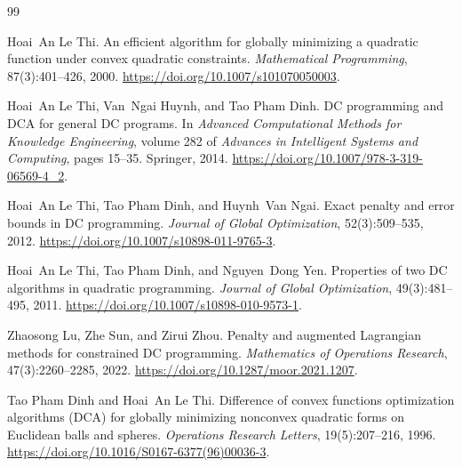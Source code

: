 \documentclass[pdflatex,sn-mathphys-num]{sn-jnl}
\theoremstyle{thmstyleone}
\theoremstyle{thmstylethree}
\newcounter{algorithm}
\begin{document}
\begin{thebibliography}{99}

Hoai~An {Le Thi}.
\newblock An efficient algorithm for globally minimizing a quadratic function
  under convex quadratic constraints.
\newblock \emph{Mathematical Programming}, 87(3):401--426, 2000.
\newblock \url{https://doi.org/10.1007/s101070050003}.

Hoai~An {Le Thi}, Van~Ngai Huynh, and Tao {Pham Dinh}.
\newblock DC programming and DCA for general DC programs.
\newblock In \emph{Advanced Computational Methods for Knowledge Engineering},
  volume 282 of \emph{Advances in Intelligent Systems and Computing},
  pages 15--35. Springer, 2014.
\newblock \url{https://doi.org/10.1007/978-3-319-06569-4_2}.

Hoai~An {Le Thi}, Tao {Pham Dinh}, and Huynh~Van Ngai.
\newblock Exact penalty and error bounds in DC programming.
\newblock \emph{Journal of Global Optimization}, 52(3):509--535, 2012.
\newblock \url{https://doi.org/10.1007/s10898-011-9765-3}.

Hoai~An {Le Thi}, Tao {Pham Dinh}, and Nguyen~Dong Yen.
\newblock Properties of two DC algorithms in quadratic programming.
\newblock \emph{Journal of Global Optimization}, 49(3):481--495, 2011.
\newblock \url{https://doi.org/10.1007/s10898-010-9573-1}.

Zhaosong Lu, Zhe Sun, and Zirui Zhou.
\newblock Penalty and augmented Lagrangian methods for constrained DC programming.
\newblock \emph{Mathematics of Operations Research}, 47(3):2260--2285, 2022.
\newblock \url{https://doi.org/10.1287/moor.2021.1207}.

Tao {Pham Dinh} and Hoai~An {Le Thi}.
\newblock Difference of convex functions optimization algorithms (DCA) for
  globally minimizing nonconvex quadratic forms on Euclidean balls and spheres.
\newblock \emph{Operations Research Letters}, 19(5):207--216, 1996.
\newblock \url{https://doi.org/10.1016/S0167-6377(96)00036-3}.


\end{thebibliography}
\end{document}
